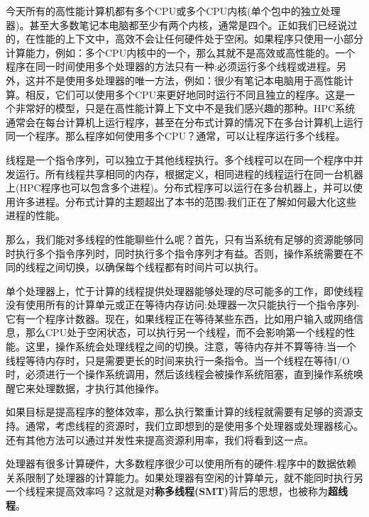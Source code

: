 
今天所有的高性能计算机都有多个CPU或多个CPU内核(单个包中的独立处理器)。甚至大多数笔记本电脑都至少有两个内核，通常是四个。正如我们已经说过的，在性能的上下文中，高效不会让任何硬件处于空闲。如果程序只使用一小部分计算能力，例如：多个CPU内核中的一个，那么其就不是高效或高性能的。一个程序在同一时间使用多个处理器的方法只有一种:必须运行多个线程或进程。另外，这并不是使用多处理器的唯一方法，例如：很少有笔记本电脑用于高性能计算。相反，它们可以使用多个CPU来更好地同时运行不同且独立的程序。这是一个非常好的模型，只是在高性能计算上下文中不是我们感兴趣的那种。HPC系统通常会在每台计算机上运行程序，甚至在分布式计算的情况下在多台计算机上运行同一个程序。那么程序如何使用多个CPU？通常，可以让程序运行多个线程。


线程是一个指令序列，可以独立于其他线程执行。多个线程可以在同一个程序中并发运行。所有线程共享相同的内存，根据定义，相同进程的线程运行在同一台机器上(HPC程序也可以包含多个进程)。分布式程序可以运行在多台机器上，并可以使用许多进程。分布式计算的主题超出了本书的范围:我们正在了解如何最大化这些进程的性能。

那么，我们能对多线程的性能聊些什么呢？首先，只有当系统有足够的资源能够同时执行多个指令序列时，同时执行多个指令序列才有益。否则，操作系统需要在不同的线程之间切换，以确保每个线程都有时间片可以执行。

单个处理器上，忙于计算的线程提供处理器能够处理的尽可能多的工作，即使线程没有使用所有的计算单元或正在等待内存访问:处理器一次只能执行一个指令序列-它有一个程序计数器。现在，如果线程正在等待某些东西，比如用户输入或网络信息，那么CPU处于空闲状态，可以执行另一个线程，而不会影响第一个线程的性能。这里，操作系统会处理线程之间的切换。注意，等待内存并不算等待:当一个线程等待内存时，只是需要更长的时间来执行一条指令。当一个线程在等待I/O时，必须进行一个操作系统调用，然后该线程会被操作系统阻塞，直到操作系统唤醒它来处理数据，才执行其他操作。

如果目标是提高程序的整体效率，那么执行繁重计算的线程就需要有足够的资源支持。通常，考虑线程的资源时，我们立即想到的是使用多个处理器或处理器核心。还有其他方法可以通过并发性来提高资源利用率，我们将看到这一点。


处理器有很多计算硬件，大多数程序很少可以使用所有的硬件:程序中的数据依赖关系限制了处理器的计算能力。如果处理器有空闲的计算单元，就不能同时执行另一个线程来提高效率吗？这就是对\textbf{称多线程(SMT)}背后的思想，也被称为\textbf{超线程}。

